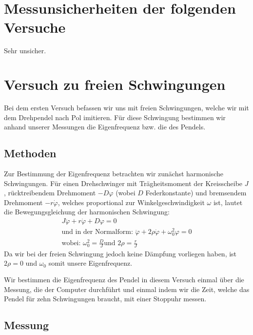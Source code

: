 \documentclass[11pt,a4paper,titlepage, ngerman]{article}
\begin{document}
	\section{Messunsicherheiten der folgenden Versuche}
		
		Sehr unsicher.
	
	\section{Versuch zu freien Schwingungen}
		
		Bei dem ersten Versuch befassen wir uns mit freien Schwingungen, welche wir mit dem Drehpendel nach Pol imitieren. Für diese Schwingung bestimmen wir anhand unserer Messungen die Eigenfrequenz bzw. die des Pendels.
		
		\subsection*{Methoden}
			
			Zur Bestimmung der Eigenfrequenz betrachten wir zunächst harmonische Schwingungen.					
			Für einen Drehschwinger mit Trägheitsmoment der Kreisscheibe $J$, rücktreibendem Drehmoment $-D\varphi$ (wobei $D$ Federkonstante) und bremsendem Drehmoment $-r\dot{\varphi}$, welches proportional zur Winkelgeschwindigkeit $\omega$ ist, lautet die Bewegungsgleichung der harmonischen Schwingung:
			\begin{align} %
				J\ddot{\varphi}+r\dot{\varphi}+D\varphi=0 \\
				\text{und in der Normalform: } \ddot{\varphi}+2\rho\dot{\varphi}+\omega_0^2\varphi=0 \label{eq:HarmonischeSchwingung}\\
				\text{wobei: } \omega_0^2 = \frac{D}{J} \text{und } 2\rho = \frac{r}{J}
			\end{align} 
			Da wir bei der freien Schwingung jedoch keine Dämpfung vorliegen haben, ist $2\rho = 0$ und $\omega_0$ somit unsere Eigenfrequenz.
			
			Wir bestimmen die Eigenfrequenz des Pendel in diesem Versuch einmal über die Messung, die der Computer durchführt und einmal indem wir die Zeit, welche das Pendel für zehn Schwingungen braucht, mit einer Stoppuhr messen.
		
		\subsection*{Messung}
			
\end{document}
